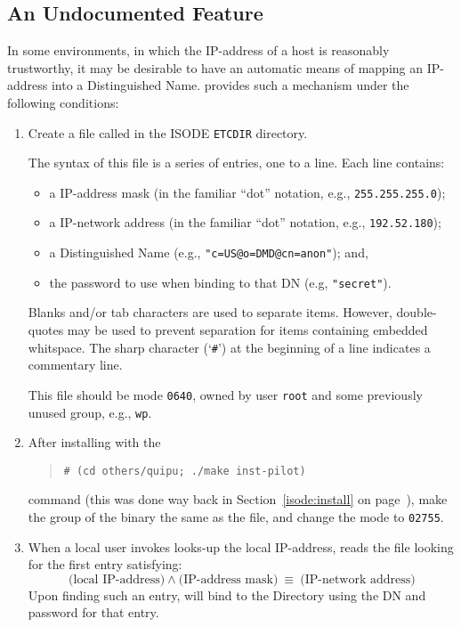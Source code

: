\subsection	{An Undocumented Feature}
In some environments,
in which the IP-address of a host is reasonably trustworthy,
it may be desirable to have an automatic means of mapping an IP-address into a
Distinguished Name.
 provides such a mechanism under the following conditions:
\begin{enumerate}
\item	Create a file called  in the ISODE \verb"ETCDIR"
	directory.

	The syntax of this file is a series of entries, one to a line.
	Each line contains:
    \begin{itemize}
    \item	a IP-address mask
		(in the familiar ``dot'' notation, e.g., \verb"255.255.255.0");

    \item	a IP-network address
		(in the familiar ``dot'' notation, e.g., \verb"192.52.180");

    \item	a Distinguished Name
		(e.g., \verb|"c=US@o=DMD@cn=anon"|);
		and,

    \item	the password to use when binding to that DN
		(e.g, \verb|"secret"|).
    \end{itemize}
Blanks and/or tab characters are used to separate items.
However, double-quotes may be used to prevent separation for items containing
embedded whitspace.
The sharp character (`\verb"#"') at the beginning of a line indicates a
commentary line.

This file should be mode \verb"0640", owned by user \verb"root" and
some previously unused group, e.g., \verb"wp".

\item	After installing  with the
\begin{quote}\small\begin{verbatim}
# (cd others/quipu; ./make inst-pilot)
\end{verbatim}\end{quote}
command
(this was done way back in Section~\ref{isode:install} on
page~\pageref{isode:install}),
make the group of the binary the same as the  file,
and change the mode to \verb"02755".

\item	When a local user invokes 
 looks-up the local IP-address,
reads the  file looking for the first entry satisfying:
$$\mbox{(local IP-address)} \land \mbox{(IP-address mask)}\ \equiv\ 
\mbox{(IP-network address)}$$
Upon finding such an entry,
 will bind to the Directory using the DN and password for that entry.


\end{enumerate}
